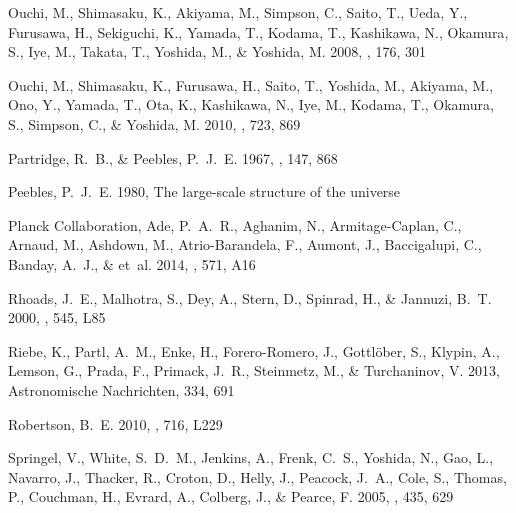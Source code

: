 \documentclass{emulateapj}
\begin{document}
\begin{thebibliography}{39}
{Ouchi}, M., {Shimasaku}, K., {Akiyama}, M., {Simpson}, C., {Saito}, T.,
  {Ueda}, Y., {Furusawa}, H., {Sekiguchi}, K., {Yamada}, T., {Kodama}, T.,
  {Kashikawa}, N., {Okamura}, S., {Iye}, M., {Takata}, T., {Yoshida}, M., \&
  {Yoshida}, M. 2008, \apjs, 176, 301

{Ouchi}, M., {Shimasaku}, K., {Furusawa}, H., {Saito}, T., {Yoshida}, M.,
  {Akiyama}, M., {Ono}, Y., {Yamada}, T., {Ota}, K., {Kashikawa}, N., {Iye},
  M., {Kodama}, T., {Okamura}, S., {Simpson}, C., \& {Yoshida}, M. 2010, \apj,
  723, 869

{Partridge}, R.~B., \& {Peebles}, P.~J.~E. 1967, \apj, 147, 868

{Peebles}, P.~J.~E. 1980, {The large-scale structure of the universe}

{Planck Collaboration}, {Ade}, P.~A.~R., {Aghanim}, N., {Armitage-Caplan}, C.,
  {Arnaud}, M., {Ashdown}, M., {Atrio-Barandela}, F., {Aumont}, J.,
  {Baccigalupi}, C., {Banday}, A.~J., \& et~al. 2014, \aap, 571, A16

{Rhoads}, J.~E., {Malhotra}, S., {Dey}, A., {Stern}, D., {Spinrad}, H., \&
  {Jannuzi}, B.~T. 2000, \apjl, 545, L85

Riebe, K., Partl, A.~M., Enke, H., Forero-Romero, J., Gottlöber, S., Klypin,
  A., Lemson, G., Prada, F., Primack, J.~R., Steinmetz, M., \& Turchaninov, V.
  2013, Astronomische Nachrichten, 334, 691

{Robertson}, B.~E. 2010, \apjl, 716, L229

{Springel}, V., {White}, S.~D.~M., {Jenkins}, A., {Frenk}, C.~S., {Yoshida},
  N., {Gao}, L., {Navarro}, J., {Thacker}, R., {Croton}, D., {Helly}, J.,
  {Peacock}, J.~A., {Cole}, S., {Thomas}, P., {Couchman}, H., {Evrard}, A.,
  {Colberg}, J., \& {Pearce}, F. 2005, \nat, 435, 629


\end{thebibliography}
\end{document}
